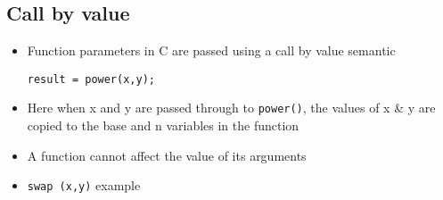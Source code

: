 \documentclass{article}[18pt]
\begin{document}
\subsection{Call by value}
\begin{itemize}
	\item Function parameters in C are passed using a call by value semantic
	\begin{verbatim}
result = power(x,y);
	\end{verbatim}
	\item Here when x and y are passed through to \texttt{power()}, the values of x \& y are copied to the base and n variables in the function
	\item A function cannot affect the value of its arguments
	\item \texttt{swap (x,y)} example
\end{itemize}
\end{document}
